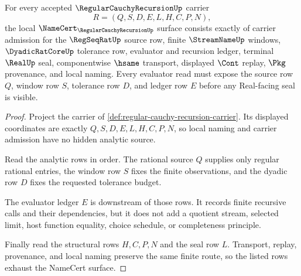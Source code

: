 \begin{theorem}
\label{thm:regular-cauchy-recursion-namecert-obligations}
For every accepted $\RegularCauchyRecursionUp$ carrier
$$
R=(Q,S,D,E,L,H,C,P,N),
$$
the local $\NameCert_{\RegularCauchyRecursionUp}$ surface consists exactly of carrier admission for the $\RegSeqRatUp$ source row, finite $\StreamNameUp$ windows, $\DyadicRatCoreUp$ tolerance row, evaluator and recursion ledger, terminal $\RealUp$ seal, componentwise $\hsame$ transport, displayed $\Cont$ replay, $\Pkg$ provenance, and local naming. Every evaluator read must expose the source row $Q$, window row $S$, tolerance row $D$, and ledger row $E$ before any Real-facing seal is visible.
\end{theorem}
\begin{proof}
Project the carrier of \autoref{def:regular-cauchy-recursion-carrier}. Its displayed coordinates are exactly $Q,S,D,E,L,H,C,P,N$, so local naming and carrier admission have no hidden analytic source.

Read the analytic rows in order. The rational source $Q$ supplies only regular rational entries, the window row $S$ fixes the finite observations, and the dyadic row $D$ fixes the requested tolerance budget.

The evaluator ledger $E$ is downstream of those rows. It records finite recursive calls and their dependencies, but it does not add a quotient stream, selected limit, host function equality, choice schedule, or completeness principle.

Finally read the structural rows $H,C,P,N$ and the seal row $L$. Transport, replay, provenance, and local naming preserve the same finite route, so the listed rows exhaust the NameCert surface.
\end{proof}

